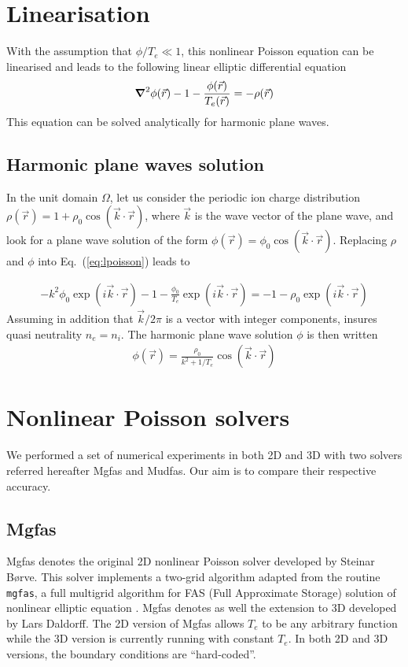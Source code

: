 \documentclass[10pt,a4paper]{article}
\def\Eq#1{Eq.~(#1)}
\newcommand*{\mgfas}{\textsf{Mgfas}\xspace}
\newcommand*{\mudfas}{\textsf{Mudfas}\xspace}
\begin{document}
\section{Linearisation}
With the assumption that $\phi/T_e\ll 1$, this nonlinear Poisson equation can
be linearised and leads to the following linear elliptic differential equation 
\begin{align}
\grad^2\phi(\vec{r})-1-\frac{\phi(\vec{r})}{T_e(\vec{r})}= -\rho(\vec{r})
\label{eq:lpoisson}
\end{align}
This equation can be solved analytically for harmonic plane waves.

\subsection{Harmonic plane waves solution}

In the unit domain $\Omega$, let us consider the periodic ion charge
distribution $\rho(\vec{r})=1+\rho_0\cos(\vec{k}\cdot\vec{r})$, where
$\vec{k}$ is the wave vector of the plane wave, and look for a plane wave
solution of the form $\phi(\vec{r})=\phi_0\cos(\vec{k}\cdot\vec{r})$.
Replacing $\rho$ and $\phi$ into \Eq{\ref{eq:lpoisson}} leads to 

\begin{align}
-k^2\phi_0\exp(i\vec{k}\cdot\vec{r})-1-
\frac{\phi_0}{T_e}\exp(i\vec{k}\cdot\vec{r})
=-1-\rho_0\exp(i\vec{k}\cdot\vec{r})
\end{align}
Assuming in addition that $\vec{k}/2\pi$ is a vector with integer
components, insures quasi neutrality $n_e=n_i$.
The harmonic plane wave solution $\phi$ is then written
\begin{align}
\phi(\vec{r})=\frac{\rho_0}{k^2+1/T_e}\cos(\vec{k}\cdot\vec{r})
\label{eq:lin}
\end{align}

\section{Nonlinear Poisson solvers}

We performed a set of numerical experiments in both 2D and 3D with two
solvers referred hereafter \mgfas and \mudfas. Our aim is to compare their
respective accuracy.

\subsection{\mgfas}
\mgfas denotes the original 2D nonlinear Poisson solver developed by
Steinar Børve. This solver implements a two-grid algorithm adapted from the 
routine \texttt{mgfas}, a
full multigrid algorithm for FAS (Full Approximate Storage) solution of
nonlinear elliptic equation \citep{press:1992}. \mgfas denotes as well the
extension to 3D developed by Lars Daldorff. The 2D version of \mgfas
allows $T_e$ to be any arbitrary function while the 3D version is currently
running with constant $T_e$. 
In both 2D and 3D versions, the boundary conditions are ``hard-coded''.
\end{document}
